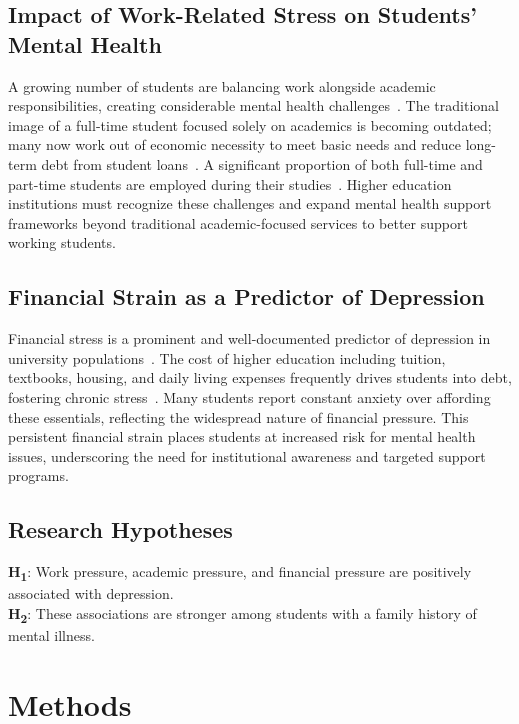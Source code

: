 \documentclass[conference]{IEEEtran}
\begin{document}
\subsection{Impact of Work-Related Stress on Students’ Mental Health}

A growing number of students are balancing work alongside academic responsibilities, creating considerable mental health challenges~\cite{b5}. The traditional image of a full-time student focused solely on academics is becoming outdated; many now work out of economic necessity to meet basic needs and reduce long-term debt from student loans~\cite{b6}. A significant proportion of both full-time and part-time students are employed during their studies~\cite{b5}. Higher education institutions must recognize these challenges and expand mental health support frameworks beyond traditional academic-focused services to better support working students.

\subsection{Financial Strain as a Predictor of Depression}

Financial stress is a prominent and well-documented predictor of depression in university populations~\cite{b6}. The cost of higher education including tuition, textbooks, housing, and daily living expenses frequently drives students into debt, fostering chronic stress~\cite{b7}. Many students report constant anxiety over affording these essentials, reflecting the widespread nature of financial pressure. This persistent financial strain places students at increased risk for mental health issues, underscoring the need for institutional awareness and targeted support programs.



\subsection{Research Hypotheses}
\textbf{H\textsubscript{1}}: Work pressure, academic pressure, and financial pressure are positively associated with depression.\\

\textbf{H\textsubscript{2}}: These associations are stronger among students with a family history of mental illness.

\section{Methods}
\end{document}
